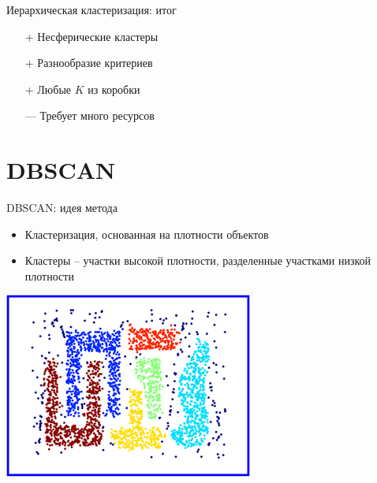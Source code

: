 \documentclass[10pt,a4paper]{beamer}
\begin{document}

\begin{frame}{Иерархическая кластеризация: итог}

\begin{itemize}
\item[+] Несферические кластеры
\item[+] Разнообразие критериев
\item[+] Любые $K$ из коробки
\item[---] Требует много ресурсов
\end{itemize}

\end{frame}


\section{DBSCAN}


\begin{frame}{DBSCAN: идея метода}

\begin{itemize}
\item Кластеризация, основанная на плотности объектов
\item Кластеры -- участки высокой плотности, разделенные участками низкой плотности
\end{itemize}

\begin{center}
\includegraphics[scale=0.6]{images/dbscan.jpg}
\end{center}

\end{frame}

\end{document}
